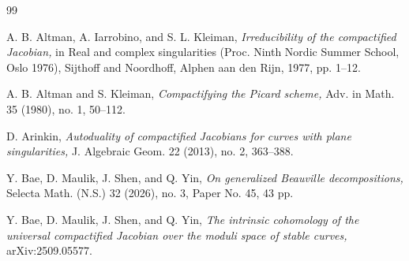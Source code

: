 \documentclass{pspum-l}
\theoremstyle{plain}
\theoremstyle{definition}
\theoremstyle{remark}
\begin{document}
\begin{thebibliography}{99}






 A. B. Altman, A. Iarrobino, and S. L. Kleiman, {\em Irreducibility of the compactified Jacobian,} in Real and complex singularities (Proc. Ninth Nordic Summer School, Oslo 1976), Sijthoff and Noordhoff, Alphen aan den Rijn, 1977, pp. 1--12.


 A. B. Altman and S. Kleiman, {\em Compactifying the Picard scheme,} Adv. in
Math. 35 (1980), no. 1, 50--112.


 D. Arinkin, {\em Autoduality of compactified Jacobians for curves with plane singularities,} J. Algebraic Geom. 22 (2013), no. 2, 363--388.





 Y. Bae, D. Maulik, J. Shen, and Q. Yin, {\em  On generalized Beauville decompositions,} Selecta Math. (N.S.) 32 (2026), no. 3, Paper No. 45, 43 pp.

 Y. Bae, D. Maulik, J. Shen, and Q. Yin, {\em The intrinsic cohomology of the universal compactified Jacobian over the moduli space of stable curves,} arXiv:2509.05577.



\end{thebibliography}
\end{document}
